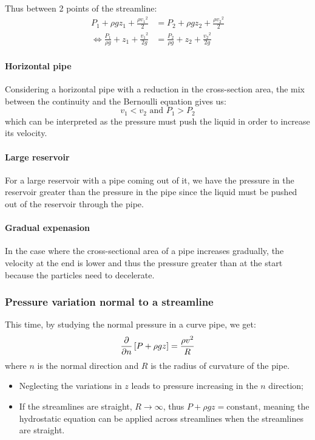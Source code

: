 \documentclass[10pt, twocolumn]{article}
\begin{document}
Thus between 2 points of the streamline:
\begin{align*}
  P_1 + \rho g z_1 + \frac{\rho {v_1}^2}{2}          & = P_2 + \rho g z_2 + \frac{\rho {v_2}^2}{2}     \\
  \iff \frac{P_1}{\rho g} + z_1 + \frac{{v_1}^2}{2g} & = \frac{P_2}{\rho g} + z_2 + \frac{{v_2}^2}{2g}
\end{align*}

\paragraph{Horizontal pipe}
Considering a horizontal pipe with a reduction in the cross-section area, the mix between the continuity and the Bernoulli equation gives us:
\[
  v_1 < v_2 \text{ and } P_1 > P_2
\]
which can be interpreted as the pressure must push the liquid in order to increase its velocity.

\paragraph{Large reservoir}
For a large reservoir with a pipe coming out of it, we have the pressure in the reservoir greater than the pressure in the pipe since the liquid must be pushed out of the reservoir through the pipe.

\paragraph{Gradual expenasion}
In the case where the cross-sectional area of a pipe increases gradually, the velocity at the end is lower and thus the pressure greater than at the start because the particles need to decelerate.


\subsubsection{Pressure variation normal to a streamline}
This time, by studying the normal pressure in a curve pipe, we get:
\[
  \frac{\partial }{\partial n} \left[ P + \rho g z \right] = \frac{\rho v^2}{R}
\]
where \(n\) is the normal direction and \(R\) is the radius of curvature of the pipe.

\begin{remark}
  \begin{itemize}
    \item Neglecting the variations in \(z\) leads to pressure increasing in the \(n\) direction;
    \item If the streamlines are straight, \(R \to \infty\), thus \(P + \rho g z = \text{constant}\), meaning the hydrostatic equation can be applied across streamlines when the streamlines are straight.
  \end{itemize}
\end{remark}
\end{document}
